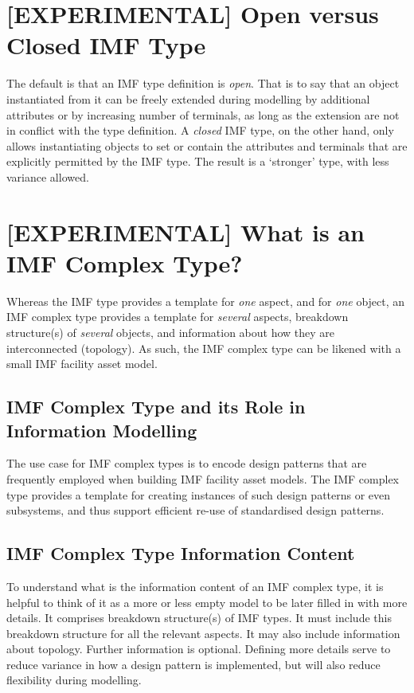 \documentclass[../main.tex]{subfiles}
\begin{document}
\section{[EXPERIMENTAL] Open versus Closed IMF Type}
The default is that an IMF type definition is \textit{open}. That is to say that an object instantiated from it can be freely extended during modelling by additional attributes or by increasing number of terminals, as long as the extension are not in conflict with the type definition.
A \emph{closed} IMF type, on the other hand, only allows instantiating objects to set or contain the attributes and terminals that are explicitly permitted by the IMF type. The result is a `stronger' type, with less variance allowed.

\section{[EXPERIMENTAL] What is an IMF Complex Type?}
\label{sec: What is an IMF Complex Type}
Whereas the IMF type provides a template for \textit{one} aspect, and for \textit{one} object, an IMF complex type provides a template for \textit{several} aspects, breakdown structure(s) of \textit{several} objects, and information about how they are interconnected (topology). As such, the IMF complex type can be likened with a small IMF facility asset model.

\subsection{IMF Complex Type and its Role in Information
  Modelling}
  The use case for IMF complex types is to encode design patterns that are frequently employed when building IMF facility asset models. The IMF complex type provides a template for creating instances of such design patterns or even subsystems, and thus support efficient re-use of standardised design patterns.
\subsection{IMF Complex Type Information Content}
To understand what is the information content of an IMF complex type, it is helpful to think of it as a more or less empty model to be later filled in with more details. It comprises breakdown structure(s) of IMF types. It must include this breakdown structure for all the relevant aspects. It may also include information about topology. Further information is optional. Defining more details serve to reduce variance in how a design pattern is implemented, but  will also reduce flexibility during modelling.
\end{document}
